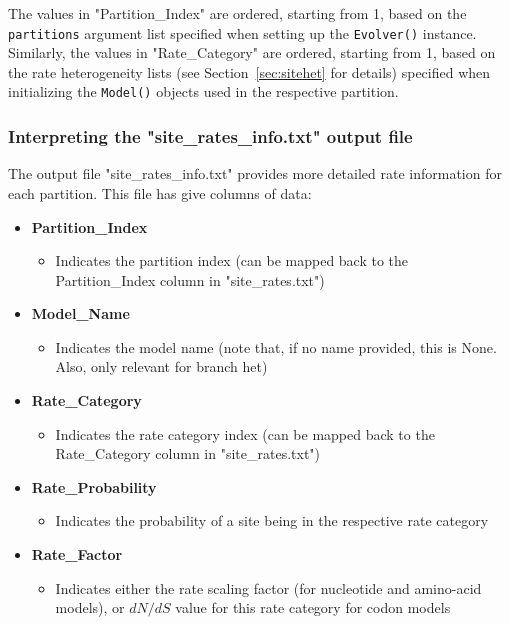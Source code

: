 \documentclass{article}
\newcommand{\code}[1]{\texttt{\small{#1}}}
\begin{document}
The values in "Partition\_Index" are ordered, starting from 1, based on the \code{partitions} argument list specified when setting up the \code{Evolver()} instance. Similarly, the values in "Rate\_Category" are ordered, starting from 1, based on the rate heterogeneity lists (see Section~\ref{sec:sitehet} for details) specified when initializing the \code{Model()} objects used in the respective partition.


\subsubsection{Interpreting the "site\_rates\_info.txt" output file}\label{sec:infofile}
The output file "site\_rates\_info.txt" provides more detailed rate information for each partition. This file has give columns of data:
\begin{itemize}
	\item \textbf{Partition\_Index}
	\begin{itemize}
		\item Indicates the partition index (can be mapped back to the Partition\_Index column in "site\_rates.txt")
	\end{itemize}
	\item \textbf{Model\_Name}
	\begin{itemize}
		\item Indicates the model name (note that, if no name provided, this is None. Also, only relevant for branch het)
	\end{itemize}
	\item \textbf{Rate\_Category}
	\begin{itemize}
		\item Indicates the rate category index (can be mapped back to the Rate\_Category column in "site\_rates.txt")
	\end{itemize}
	\item \textbf{Rate\_Probability}
	\begin{itemize}
		\item Indicates the probability of a site being in the respective rate category
	\end{itemize}
	\item \textbf{Rate\_Factor}
	\begin{itemize}
		\item Indicates either the rate scaling factor (for nucleotide and amino-acid models), or $dN/dS$ value for this rate category for codon models
	\end{itemize}
\end{itemize}
\end{document}
